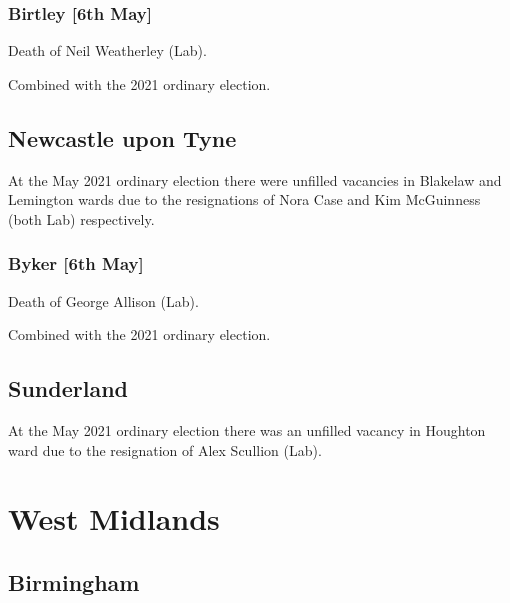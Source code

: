 \documentclass[a4paper,openany]{book}
\begin{document}
\begin{resultsiii}
\subsubsection*{Birtley \hspace*{\fill}\nolinebreak[1]%
	\enspace\hspace*{\fill}
	[6th May]}


Death of Neil Weatherley (Lab).

Combined with the 2021 ordinary election.

\subsection*{Newcastle upon Tyne}

At the May 2021 ordinary election there were unfilled vacancies in Blakelaw and Lemington wards due to the resignations of Nora Case and Kim McGuinness (both Lab) respectively.

\subsubsection*{Byker \hspace*{\fill}\nolinebreak[1]%
	\enspace\hspace*{\fill}
	[6th May]}


Death of George Allison (Lab).

Combined with the 2021 ordinary election.

\subsection*{Sunderland}

At the May 2021 ordinary election there was an unfilled vacancy in Houghton ward due to the resignation of Alex Scullion (Lab).

\section{West Midlands}

\subsection*{Birmingham}


\end{resultsiii}
\end{document}
